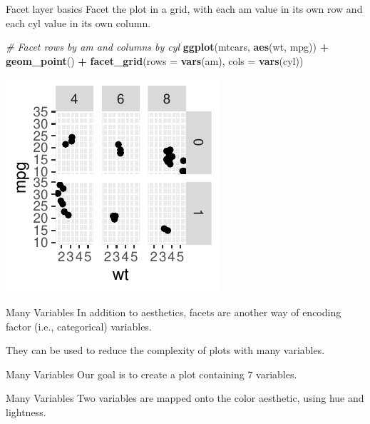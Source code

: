 \documentclass[
  ignorenonframetext,
]{beamer}
\newenvironment{Shaded}{\begin{snugshade}}{\end{snugshade}}
\newcommand{\AttributeTok}[1]{\textcolor[rgb]{0.13,0.29,0.53}{#1}}
\newcommand{\CommentTok}[1]{\textcolor[rgb]{0.56,0.35,0.01}{\textit{#1}}}
\newcommand{\FunctionTok}[1]{\textcolor[rgb]{0.13,0.29,0.53}{\textbf{#1}}}
\newcommand{\NormalTok}[1]{#1}
\newcommand{\SpecialCharTok}[1]{\textcolor[rgb]{0.81,0.36,0.00}{\textbf{#1}}}
\begin{document}
\begin{frame}[fragile]{Facet layer basics}
\label{facet-layer-basics-5}
Facet the plot in a grid, with each am value in its own row and each cyl
value in its own column.


\begin{Shaded}
\begin{Highlighting}[]
\CommentTok{\# Facet rows by am and columns by cyl}
\FunctionTok{ggplot}\NormalTok{(mtcars, }\FunctionTok{aes}\NormalTok{(wt, mpg)) }\SpecialCharTok{+} \FunctionTok{geom\_point}\NormalTok{() }\SpecialCharTok{+} \FunctionTok{facet\_grid}\NormalTok{(}\AttributeTok{rows =} \FunctionTok{vars}\NormalTok{(am),}
    \AttributeTok{cols =} \FunctionTok{vars}\NormalTok{(cyl))}
\end{Highlighting}
\end{Shaded}

\begin{center}\includegraphics[width=0.5\linewidth]{Figs/unnamed-chunk-75-1} \end{center}
\end{frame}

\begin{frame}{Many Variables}
\label{many-variables}
In addition to aesthetics, facets are another way of encoding factor
(i.e., categorical) variables.

They can be used to reduce the complexity of plots with many variables.
\end{frame}

\begin{frame}{Many Variables}
\label{many-variables-1}
Our goal is to create a plot containing 7 variables.
\end{frame}

\begin{frame}{Many Variables}
\label{many-variables-2}
Two variables are mapped onto the color aesthetic, using hue and
lightness.
\end{frame}
\end{document}
